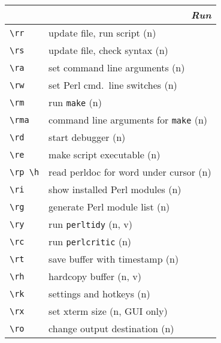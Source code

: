 \documentclass[oneside,10pt,landscape,DIV17]{scrartcl}
\begin{document}
\newpage
%
%
\begin{multicols}{2}
%
\begin{tabular}[]{|p{11mm}|p{58mm}|}
\hline
\multicolumn{2}{|r|}{\textsl{\textbf{R}un}} \\[1.0ex]
\hline \verb'\rr'    & update file, run script                  \hfill (n)   \\
\hline \verb'\rs'    & update file, check syntax                \hfill (n)   \\
\hline \verb'\ra'    & set command line arguments               \hfill (n)   \\
\hline \verb'\rw'    & set Perl cmd.\ line switches             \hfill (n)   \\
\hline \verb'\rm'    & run \texttt{make}                        \hfill (n)   \\
\hline \verb'\rma'   & command line arguments for \texttt{make} \hfill (n)   \\
\hline \verb'\rd'    & start debugger                           \hfill (n)   \\
\hline \verb'\re'    & make script executable                   \hfill (n)   \\
\hline \verb'\rp \h' & read perldoc for word under cursor       \hfill (n)   \\
\hline \verb'\ri'    & show installed Perl modules              \hfill (n)   \\
\hline \verb'\rg'    & generate Perl module list                \hfill (n)   \\
\hline \verb'\ry'    & run \verb'perltidy'                      \hfill (n, v)\\
\hline \verb'\rc'    & run \verb'perlcritic'                    \hfill (n)   \\
\hline \verb'\rt'    & save buffer with timestamp               \hfill (n)   \\
\hline \verb'\rh'    & hardcopy buffer                          \hfill (n, v)\\
\hline \verb'\rk'    & settings and hotkeys                     \hfill (n)   \\
\hline \verb'\rx'    & set xterm size                           \hfill (n, {\tiny GUI only})\\
\hline \verb'\ro'    & change output destination                \hfill (n)   \\
\hline
\end{tabular}%
%


\end{multicols}
\end{document}
